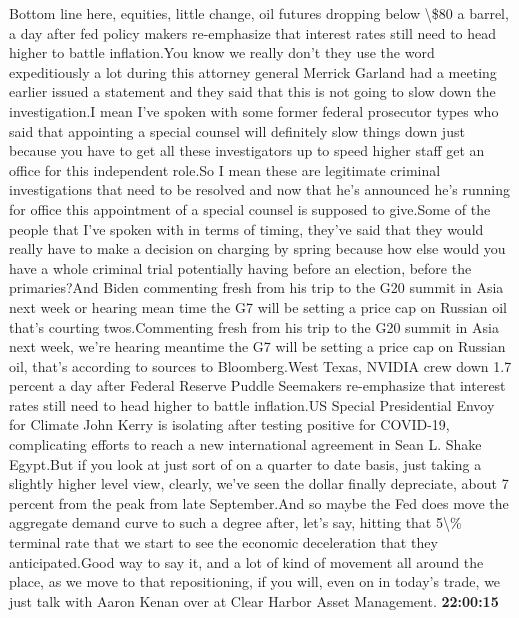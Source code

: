 \documentclass{article}%
\begin{document}
Bottom line here, equities, little change, oil futures dropping below \textbackslash{}\$80 a barrel, a day after fed policy makers re{-}emphasize that interest rates still need to head higher to battle inflation.You know we really don't they use the word expeditiously a lot during this attorney general Merrick Garland had a meeting earlier issued a statement and they said that this is not going to slow down the investigation.I mean I've spoken with some former federal prosecutor types who said that appointing a special counsel will definitely slow things down just because you have to get all these investigators up to speed higher staff get an office for this independent role.So I mean these are legitimate criminal investigations that need to be resolved and now that he's announced he's running for office this appointment of a special counsel is supposed to give.Some of the people that I've spoken with in terms of timing, they've said that they would really have to make a decision on charging by spring because how else would you have a whole criminal trial potentially having before an election, before the primaries?And Biden commenting fresh from his trip to the G20 summit in Asia next week or hearing mean time the G7 will be setting a price cap on Russian oil that's courting twos.Commenting fresh from his trip to the G20 summit in Asia next week, we're hearing meantime the G7 will be setting a price cap on Russian oil, that's according to sources to Bloomberg.West Texas, NVIDIA crew down 1.7 percent a day after Federal Reserve Puddle Seemakers re{-}emphasize that interest rates still need to head higher to battle inflation.US Special Presidential Envoy for Climate John Kerry is isolating after testing positive for COVID{-}19, complicating efforts to reach a new international agreement in Sean L. Shake Egypt.But if you look at just sort of on a quarter to date basis, just taking a slightly higher level view, clearly, we've seen the dollar finally depreciate, about 7 percent from the peak from late September.And so maybe the Fed does move the aggregate demand curve to such a degree after, let's say, hitting that 5\textbackslash{}\% terminal rate that we start to see the economic deceleration that they anticipated.Good way to say it, and a lot of kind of movement all around the place, as we move to that repositioning, if you will, even on in today's trade, we just talk with Aaron Kenan over at Clear Harbor Asset Management.%
\textbf{22:00:15}%
\newline%
\end{document}
